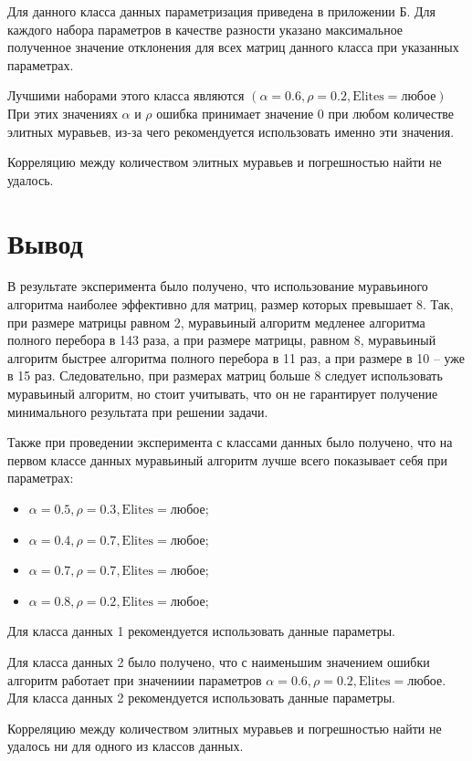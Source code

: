 Для данного класса данных параметризация приведена в приложении Б.
Для каждого набора параметров в качестве разности указано максимальное полученное значение отклонения для всех матриц данного класса при указанных параметрах.

Лучшими наборами этого класса являются $(\alpha = 0.6, \rho = 0.2, \text{Elites} = \text{любое})$
При этих значениях $\alpha$ и $\rho$ ошибка принимает значение 0 при любом количестве элитных муравьев, из-за чего рекомендуется использовать именно эти значения.

Корреляцию между количеством элитных муравьев и погрешностью найти не удалось.

\section*{Вывод}

В результате эксперимента было получено, что использование муравьиного алгоритма наиболее эффективно для матриц, размер которых превышает 8.
Так, при размере матрицы равном 2, муравьиный алгоритм медленее алгоритма полного перебора в 143 раза, а при размере матрицы, равном 8, муравьиный алгоритм быстрее алгоритма полного перебора в 11 раз, а при размере в 10 -- уже в 15 раз.
Следовательно, при размерах матриц больше 8 следует использовать муравьиный алгоритм, но стоит учитывать, что он не гарантирует получение минимального результата при решении задачи.

Также при проведении эксперимента с классами данных было получено, что на первом классе данных муравьиный алгоритм лучше всего показывает себя при параметрах:
\begin{itemize}[label=---]
	\item $\alpha = 0.5, \rho = 0.3, \text{Elites} = \text{любое}$;
	\item $\alpha = 0.4, \rho = 0.7, \text{Elites} = \text{любое}$;
	\item $\alpha = 0.7, \rho = 0.7, \text{Elites} = \text{любое}$;
	\item $\alpha = 0.8, \rho = 0.2, \text{Elites} = \text{любое}$;
\end{itemize}

Для класса данных 1 рекомендуется использовать данные параметры.

Для класса данных 2 было получено, что с наименьшим значением ошибки алгоритм работает при значениии параметров $\alpha = 0.6, \rho = 0.2, \text{Elites} = \text{любое}$.
Для класса данных 2 рекомендуется использовать данные параметры.

Корреляцию между количеством элитных муравьев и погрешностью найти не удалось ни для одного из классов данных.